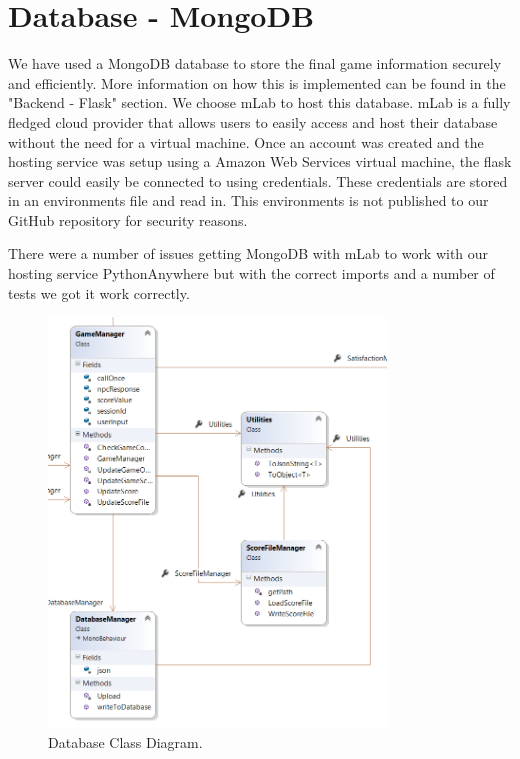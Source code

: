\section{Database - MongoDB}
We have used a MongoDB database to store the final game information securely and efficiently. More information on how this is implemented can be found in the "Backend - Flask" section. We choose mLab to host this database. mLab is a fully fledged cloud provider that allows users to easily access and host their database without the need for a virtual machine. Once an account was created and the hosting service was setup using a Amazon Web Services virtual machine, the flask server could easily be connected to using credentials. These credentials are stored in an environments file and read in. This environments is not published to our GitHub repository for security reasons. 

There were a number of issues getting MongoDB with mLab to work with our hosting service PythonAnywhere but with the correct imports and a number of tests we got it work correctly.

\begin{figure}[ht]
	\caption{Database Class Diagram.}
	\label{image:Database}
	\centering
	\includegraphics[width=0.8\textwidth]{Images/ClassDiagram Database.png}
\end{figure}


